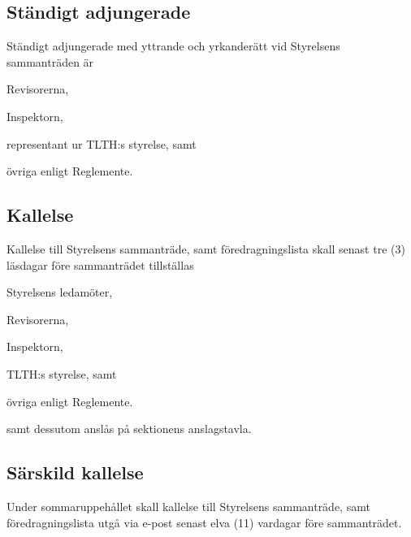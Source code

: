 \documentclass[10pt]{article}
\begin{document}
\subsection{Ständigt adjungerade}
Ständigt adjungerade med yttrande och yrkanderätt
vid Styrelsens sammanträden är

\begin{alphlist}
\item Revisorerna,
\item Inspektorn,
\item representant ur TLTH:s styrelse, samt
\item övriga enligt Reglemente.
\end{alphlist}

\subsection{Kallelse}
Kallelse till Styrelsens sammanträde, samt föredragningslista skall senast
tre (3) läsdagar före sammanträdet tillställas

\begin{alphlist}
\item Styrelsens ledamöter,
\item Revisorerna,
\item Inspektorn,
\item TLTH:s styrelse, samt
\item övriga enligt Reglemente.
\end{alphlist}

samt dessutom anslås på sektionens anslagstavla.

\subsection{Särskild kallelse}
Under sommaruppehållet skall kallelse till Styrelsens sammanträde, samt
föredragningslista utgå via e-post senast elva (11) vardagar före sammanträdet.
\end{document}
